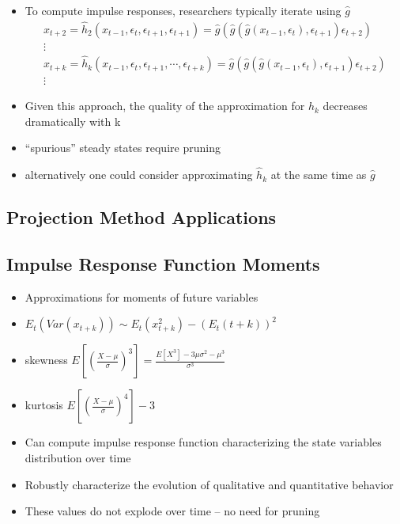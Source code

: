 \documentclass[12pt]{article}
\begin{document}
  \begin{itemize}
  \item To compute impulse responses, researchers typically iterate using $\hat{g}$
\begin{gather*}
x_{t+2}=  \hat{h}_2(x_{t-1},\epsilon_t,\epsilon_{t+1},\epsilon_{t+1})= \hat{g}(\hat{g}(\hat{g}(x_{t-1},\epsilon_t), \epsilon_{t+1}) \epsilon_{t+2})\\
\vdots \\
x_{t+k}=  \hat{h}_k(x_{t-1},\epsilon_t,\epsilon_{t+1},\cdots,\epsilon_{t+k})= \hat{g}(\hat{g}(\hat{g}(x_{t-1},\epsilon_t), \epsilon_{t+1}) \epsilon_{t+2})\\
\vdots
\end{gather*}
  \item Given this approach, the quality of the approximation for $h_k$ decreases dramatically with k
  \item ``spurious'' steady states require pruning
  \item alternatively one could consider approximating $\hat{h}_k$ at the same time as $\hat{g}$
  \end{itemize}

\subsection{Projection Method Applications}
\label{sec:proj-meth-appl}

\subsection{Impulse Response Function Moments}
\label{sec:impulse-resp-funct}


  \begin{itemize}
\item Approximations for moments of future variables
\item $E_t(Var(x_{t+k})) \sim E_t(x_{t+k}^2)   - (E_t({t+k}))^2$
\item skewness
$E\left [ \left ( \frac{X-\mu}{\sigma} \right )^3 \right ] = \frac{E[X^3] - 3 \mu \sigma^2 - \mu^3}{\sigma^3}$
\item kurtosis
$E\left [ \left ( \frac{X-\mu}{\sigma} \right )^4 \right ] -3$
\item Can compute impulse response function characterizing the state variables 
distribution over time
\item Robustly characterize the evolution of qualitative and quantitative behavior
\item These values do not explode over time -- no need for pruning

  \end{itemize}
\end{document}
